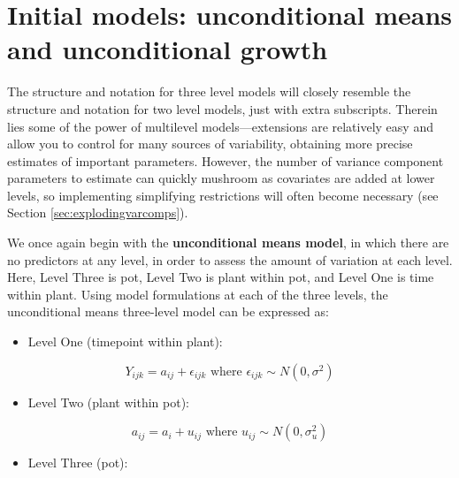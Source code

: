 \documentclass[
]{krantz}
\providecommand{\tightlist}{%
  \setlength{\itemsep}{0pt}\setlength{\parskip}{0pt}}
\begin{document}
\hypertarget{initialmodels-3level}{%
\section{Initial models: unconditional means and unconditional growth}\label{initialmodels-3level}}

The structure and notation for three level models will closely resemble the structure and notation for two level models, just with extra subscripts. Therein lies some of the power of multilevel models---extensions are relatively easy and allow you to control for many sources of variability, obtaining more precise estimates of important parameters. However, the number of variance component parameters to estimate can quickly mushroom as covariates are added at lower levels, so implementing simplifying restrictions will often become necessary (see Section \ref{sec:explodingvarcomps}).

We once again begin with the \textbf{unconditional means model},  in which there are no predictors at any level, in order to assess the amount of variation at each level. Here, Level Three is pot, Level Two is plant within pot, and Level One is time within plant. Using model formulations at each of the three levels, the unconditional means three-level model can be expressed as:

\begin{itemize}
\tightlist
\item
  Level One (timepoint within plant):
\end{itemize}

\begin{equation*}
Y_{ijk} = a_{ij}+\epsilon_{ijk} \textrm{ where } \epsilon_{ijk}\sim N(0,\sigma^2)
\end{equation*}

\begin{itemize}
\tightlist
\item
  Level Two (plant within pot):
\end{itemize}

\begin{equation*}
a_{ij} = a_{i}+u_{ij} \textrm{ where } u_{ij}\sim N(0,\sigma_{u}^{2})
\end{equation*}

\begin{itemize}
\tightlist
\item
  Level Three (pot):
\end{itemize}
\end{document}
